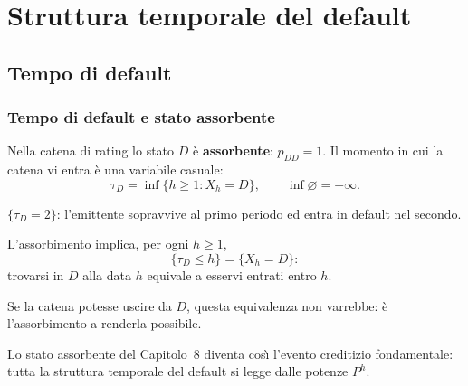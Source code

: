 



\section{Struttura temporale del default}

\subsection{Tempo di default}%

\begin{frame}%
%

\frametitle{Tempo di default e stato assorbente}%
%

%


Nella catena di rating lo stato $D$ \`{e} \textbf{assorbente}: $p_{DD}=1$. Il
momento in cui la catena vi entra \`{e} una variabile casuale:
\[
\tau_{D} = \inf\{ h\geq1:X_{h}=D \}, \qquad\inf\varnothing=+\infty.
\]


\medskip

\begin{stepitemize}


\item $\{\tau_{D}=2\}$: l'emittente sopravvive al primo periodo ed entra in
default nel secondo.

\item L'assorbimento implica, per ogni $h\geq1$,
\[
\{\tau_{D}\leq h\} = \{X_{h}=D\}:
\]
trovarsi in $D$ alla data $h$ equivale a esservi entrati entro $h$.

\item Se la catena potesse uscire da $D$, questa equivalenza non varrebbe:
\`{e} l'assorbimento a renderla possibile.
\end{stepitemize}

\medskip

\begin{center}
{\small Lo stato assorbente del Capitolo~8 diventa cos\`{\i} l'evento
creditizio fondamentale: tutta la struttura temporale del default si legge
dalle potenze $P^{h}$.}
\end{center}

%

\transboxout
\end{frame}%


